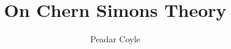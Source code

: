\documentclass[a4paper,10pt]{article}
\title{On Chern Simons Theory}
\author{Peadar Coyle}
\begin{document}
\maketitle
{}
\tableofcontents
\listoffigures
\listoftables

\begin{abstract}
\end{abstract}







%


%



\end{document}

